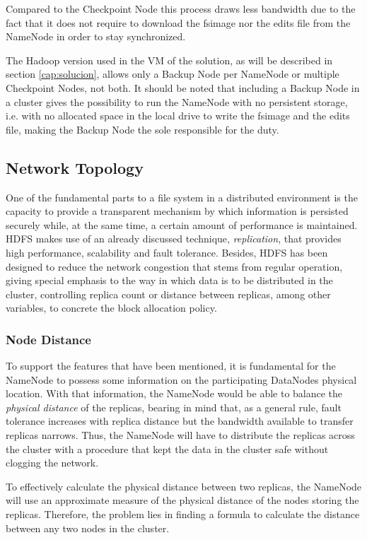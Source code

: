 Compared to the Checkpoint Node this process draws less bandwidth due to the fact that it does not require to download the fsimage nor the edits file from the NameNode in order to stay synchronized.

The Hadoop version used in the VM of the solution, as will be described in section \ref{cap:solucion}, allows only a Backup Node per NameNode or multiple Checkpoint Nodes, not both. It should be noted that including a Backup Node in a cluster gives the possibility to run the NameNode with no persistent storage, i.e. with no allocated space in the local drive to write the fsimage and the edits file, making the Backup Node the sole responsible for the duty.

\subsection{Network Topology}\label{subsec:topologiared}
\noindent One of the fundamental parts to a file system in a distributed environment is the capacity to provide a transparent mechanism by which information is persisted securely while, at the same time, a certain amount of performance is maintained. HDFS makes use of an already discussed technique, \emph{replication}, that provides high performance, scalability and fault tolerance. Besides, HDFS has been designed to reduce the network congestion that stems from regular operation, giving special emphasis to the way in which data is to be distributed in the cluster, controlling replica count or distance between replicas, among other variables, to concrete the block allocation policy.

\subsubsection{Node Distance}\label{subsubsec:distnodos}
\noindent To support the features that have been mentioned, it is fundamental for the NameNode to possess some information on the participating DataNodes physical location. With that information, the NameNode would be able to balance the \emph{physical distance} of the replicas, bearing in mind that, as a general rule, fault tolerance increases with replica distance but the bandwidth available to transfer replicas narrows. Thus, the NameNode will have to distribute the replicas across the cluster with a procedure that kept the data in the cluster safe without clogging the network.

To effectively calculate the physical distance between two replicas, the NameNode will use an approximate measure of the physical distance of the nodes storing the replicas. Therefore, the problem lies in finding a formula to calculate the distance between any two nodes in the cluster.

